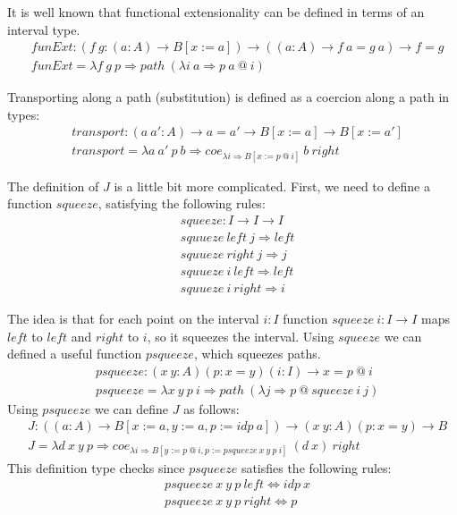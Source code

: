 \documentclass[8pt]{amsart}
\theoremstyle{definition}
\theoremstyle{remark}
\newcommand{\red}{\Rightarrow}
\newcommand{\deq}{\Leftrightarrow}
\numberwithin{figure}{section}
\begin{document}
It is well known that functional extensionality can be defined in terms of an interval type.
\begin{align*}
    & funExt : (f\ g : (a : A) \to B[x := a]) \to ((a : A) \to f\ a = g\ a) \to f = g \\
    & funExt = \lambda f\ g\ p \red path\ (\lambda i\ a \red p\ a\ @\ i)
\end{align*}

Transporting along a path (substitution) is defined as a coercion along a path in types:
\begin{align*}
    & transport : (a\ a' : A) \to a = a' \to B[x := a] \to B[x := a'] \\
    & transport = \lambda a\ a'\ p\ b \red coe_{\lambda i \red B[x := p\ @\ i]}\ b\ right
\end{align*}

The definition of $J$ is a little bit more complicated.
First, we need to define a function $squeeze$, satisfying the following rules:
\begin{align*}
    & squeeze : I \to I \to I \\
    & squueze\ left\ j \red left \\
    & squueze\ right\ j \red j \\
    & squueze\ i\ left \red left \\
    & squueze\ i\ right \red i
\end{align*}

The idea is that for each point on the interval $i : I$ function $squeeze\ i : I \to I$ maps $left$ to $left$ and $right$ to $i$, so it squeezes the interval.
Using $squeeze$ we can defined a useful function $psqueeze$, which squeezes paths.
\begin{align*}
    & psqueeze : (x\ y : A) (p : x = y) (i : I) \to x = p\ @\ i \\
    & psqueeze = \lambda x\ y\ p\ i \red path\ (\lambda j \red p\ @\ squeeze\ i\ j)
\end{align*}
Using $psqueeze$ we can define $J$ as follows:
\begin{align*}
    & J : ((a : A) \to B[x := a, y := a, p := idp\ a]) \to (x\ y : A) (p : x = y) \to B \\
    & J = \lambda d\ x\ y\ p \red coe_{\lambda i \red B[y := p\ @\ i, p := psqueeze\ x\ y\ p\ i]}\ (d\ x)\ right
\end{align*}
This definition type checks since $psqueeze$ satisfies the following rules:
\begin{align*}
    & psqueeze\ x\ y\ p\ left \deq idp\ x \\
    & psqueeze\ x\ y\ p\ right \deq p
\end{align*}
\end{document}
